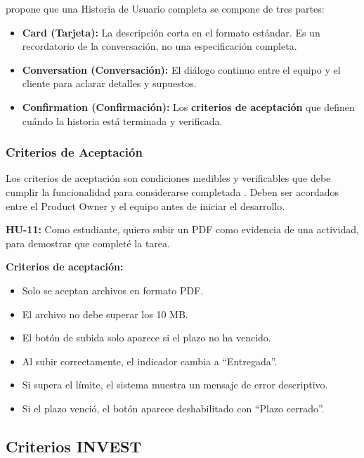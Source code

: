 \documentclass[12pt, a4paper]{article}
\begin{document}
\textcite{jeffries2001} propone que una Historia de Usuario completa
se compone de tres partes:

\begin{itemize}[leftmargin=1.5cm]
  \item \textbf{Card (Tarjeta):} La descripción corta en el formato estándar.
        Es un recordatorio de la conversación, no una especificación completa.
  \item \textbf{Conversation (Conversación):} El diálogo continuo entre el
        equipo y el cliente para aclarar detalles y supuestos.
  \item \textbf{Confirmation (Confirmación):} Los \textbf{criterios de
        aceptación} que definen cuándo la historia está terminada y verificada.
\end{itemize}

\subsubsection{Criterios de Aceptación}

Los criterios de aceptación son condiciones medibles y verificables que debe
cumplir la funcionalidad para considerarse completada \parencite{wiegers2013}.
Deben ser acordados entre el Product Owner y el equipo antes de iniciar el
desarrollo.

\begin{ejemplobox}
  \textbf{HU-11:} Como estudiante, quiero subir un PDF como evidencia de una
  actividad, para demostrar que completé la tarea.

  \vspace{0.3cm}\textbf{Criterios de aceptación:}
  \begin{itemize}[noitemsep]
    \item Solo se aceptan archivos en formato PDF.
    \item El archivo no debe superar los 10 MB.
    \item El botón de subida solo aparece si el plazo no ha vencido.
    \item Al subir correctamente, el indicador cambia a ``Entregada''.
    \item Si supera el límite, el sistema muestra un mensaje de error descriptivo.
    \item Si el plazo venció, el botón aparece deshabilitado con ``Plazo cerrado''.
  \end{itemize}
\end{ejemplobox}

\subsection{Criterios INVEST}
\end{document}
